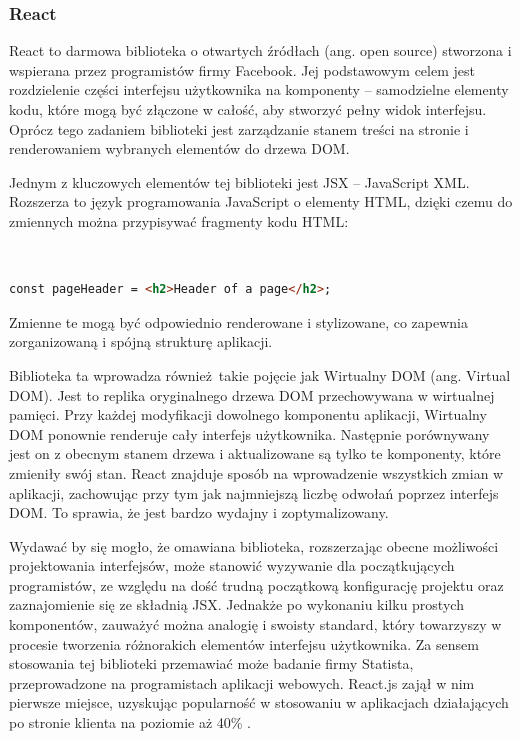 \documentclass[12pt,twoside]{article}
\begin{document}
\subsubsection{React}

React to darmowa biblioteka o otwartych źródłach (ang. open source) stworzona i wspierana przez programistów firmy Facebook. Jej podstawowym celem jest rozdzielenie części interfejsu użytkownika na komponenty -- samodzielne elementy kodu, które mogą być złączone w całość, aby stworzyć pełny widok interfejsu. Oprócz tego zadaniem biblioteki jest zarządzanie stanem treści na stronie i renderowaniem wybranych elementów do drzewa DOM. 

Jednym z kluczowych elementów tej biblioteki jest JSX -- JavaScript XML. Rozszerza to język programowania JavaScript o elementy HTML, dzięki czemu do zmiennych można przypisywać fragmenty kodu HTML:

\

\begin{lstlisting}[language=HTML,caption=Nagłówek strony w wykonany w składni JSX,label={KodJS}]
	const pageHeader = <h2>Header of a page</h2>;
\end{lstlisting}

Zmienne te mogą być odpowiednio renderowane i stylizowane, co zapewnia zorganizowaną i spójną strukturę aplikacji.

Biblioteka ta wprowadza również takie pojęcie jak Wirtualny DOM (ang. Virtual DOM). Jest to replika oryginalnego drzewa DOM przechowywana w wirtualnej pamięci. Przy każdej modyfikacji dowolnego komponentu aplikacji, Wirtualny DOM ponownie renderuje cały interfejs użytkownika. Następnie porównywany jest on z obecnym stanem drzewa i aktualizowane są tylko te komponenty, które zmieniły swój stan. React znajduje sposób na wprowadzenie wszystkich zmian w aplikacji, zachowując przy tym jak najmniejszą liczbę odwołań poprzez interfejs DOM. To sprawia, że jest bardzo wydajny i zoptymalizowany.

Wydawać by się mogło, że omawiana biblioteka, rozszerzając obecne możliwości projektowania interfejsów, może stanowić wyzywanie dla początkujących programistów, ze względu na dość trudną początkową konfigurację projektu oraz zaznajomienie się ze składnią JSX. Jednakże po wykonaniu kilku prostych komponentów, zauważyć można analogię i swoisty standard, który towarzyszy w procesie tworzenia różnorakich elementów interfejsu użytkownika. Za sensem stosowania tej biblioteki przemawiać może badanie firmy Statista, przeprowadzone na programistach aplikacji webowych. React.js zajął w nim pierwsze miejsce, uzyskując popularność w stosowaniu w aplikacjach działających po stronie klienta na poziomie aż 40\% \cite{ReactPopular}.
\end{document}
